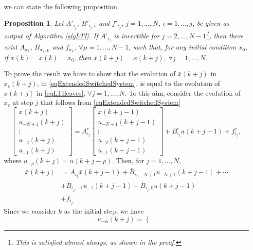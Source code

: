 \documentclass[]{ifacconf}  %
\newtheorem{proposition}[theorem]{Proposition}
\begin{document}
\normalsize
we can state the following proposition.
\begin{proposition}\label{propSwitchedSystem}
	Let $A'_{i_j}$, $B'_{i_j,\iota}$ and $f'_{i_j}$, $j=1,\ldots,N$, $\iota=1,\ldots,j$, be given as output of Algorithm \ref{algLTI}. If $A'_{i_j}$ is invertible for $j=2,\ldots,N-1$\footnote{This is satisfied almost always, as shown in the proof.}, then there exist $A_{\sigma_k}$, $\bar B_{\sigma_k,\mu}$ and $\bar f_{\sigma_k}$, $\forall \mu=1,\ldots,N-1$, such that, for any initial condition $x_0$, if $\bar x(k) = x(k) = x_0$, then $\bar x(k+j) = x(k+j),\ \forall j=1,\ldots,N$.
\end{proposition}
\begin{pf}
	To prove the result we have to show that the evolution of $\bar x(k+j)$ in $x_e(k+j)$, in \eqref{eqExtendedSwitchedSystem}, is equal to the evolution of $x(k+j)$ in \eqref{eqLTIleaves}, $\forall j=1,\ldots,N$. To this aim, consider the evolution of $x_e$ at step $j$ that follows from \eqref{eqExtendedSwitchedSystem}
	\small
	\begin{equation}
	\left[\begin{array}{c}
	\bar x(k+j) \\
	u_{-N+1}(k+j)\\
	\vdots\\
	u_{-2}(k+j)\\
	u_{-1}(k+j)
	\end{array}\right] = A_{i_j}^e	
	\left[\begin{array}{c}
	\bar x(k+j-1) \\
	u_{-N+1}(k+j-1)\\
	\vdots\\
	u_{-2}(k+j-1)\\
	u_{-1}(k+j-1)
	\end{array}\right]+ B_{i_j}^e u(k+j-1) + f^e_{i_j},		
	\end{equation}
	\normalsize
	where $u_{-\rho}(k+j) = u(k+j-\rho)$. Then, for $j=1,\ldots,N$,
	\small
	\begin{align}\label{eqBarxInit}
	\nonumber\bar x(k+j) &= A_{i_j}\bar x(k+j-1) + \bar B_{i_j,-N+1}u_{-N+1}(k+j-1)+ \cdots\\
	& +  \bar B_{i_j,-1}u_{-1}(k+j-1) + \bar B_{i_j,0}u(k+j-1)\\
	\nonumber &+ \bar f_{i_j}
	\end{align}
	\normalsize
	Since we consider $k$ as the initial step, we have
	\small
	\begin{equation}
	u_{-\alpha}(k+j) =\begin{cases}

\end{cases}
\end{equation}
\end{pf}
\end{document}
